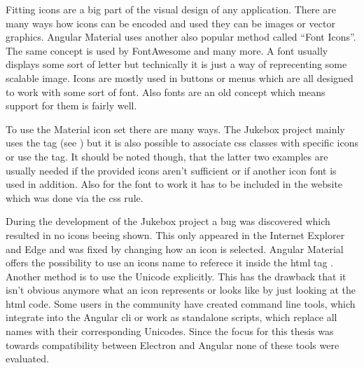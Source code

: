 \cite{matDialog}



Fitting icons are a big part of the visual design of any application. There are many ways how icons can be encoded and used \zB they can be images or vector graphics. Angular Material uses another also popular method called \enquote{Font Icons}. The same concept is used by FontAwesome \cite{fontAwesome} and many more. A font usually displays some sort of letter but technically it is just a way of reprecenting some scalable image. Icons are mostly used in buttons or menus which are all designed to work with some sort of font. Also fonts are an old concept which means support for them is fairly well.

To use the Material icon set there are many ways. The Jukebox project mainly uses the  tag (see ) but it is also possible to associate \gls{css} classes with specific icons or use the  tag. It should be noted though, that the latter two examples are usually needed if the provided icons aren't sufficient or if \zB another icon font is used in addition. Also for the font to work it has to be included in the website which was done via the  \gls{css} rule.

During the development of the Jukebox project a bug was discovered which resulted in no icons beeing shown. This only appeared in the Internet Explorer and Edge and was fixed by changing how an icon is selected. Angular Material offers the possibility to use an icons name to referece it inside the \gls{html} tag \zB {}. Another method is to use the Unicode explicitly. This has the drawback that it isn't obvious anymore what an icon represents or looks like by just looking at the \gls{html} code. Some users in the community have created command line tools, which integrate into the Angular \gls{cli} or work as standalone scripts, which replace all names with their corresponding Unicodes. Since the focus for this thesis was towards compatibility between Electron and Angular none of these tools were evaluated. \cite{materialIcons}
